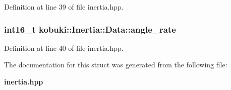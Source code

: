 \-Definition at line 39 of file inertia.\-hpp.

\subsubsection[{angle\-\_\-rate}]{\setlength{\rightskip}{0pt plus 5cm}int16\-\_\-t {\bf kobuki\-::\-Inertia\-::\-Data\-::angle\-\_\-rate}}\label{structkobuki_1_1Inertia_1_1Data_af44f592fb74158c5bcf5b275c67fc3b4}


\-Definition at line 40 of file inertia.\-hpp.



\-The documentation for this struct was generated from the following file\-:\begin{DoxyCompactItemize}
\item 
{\bf inertia.\-hpp}\end{DoxyCompactItemize}
